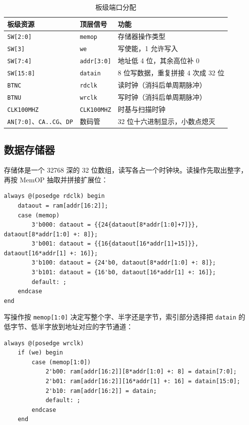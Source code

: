 \documentclass[12pt, a4paper]{ctexart}
\begin{document}
\begin{table}[htbp]
    \centering
    \caption{板级端口分配}
    \begin{tabular}{lll}
        \hline
        板级资源 & 顶层信号 & 功能 \\
        \hline
        \texttt{SW[2:0]}  & \texttt{memop} & 存储器操作类型 \\
        \texttt{SW[3]}    & \texttt{we}    & 写使能，1 允许写入 \\
        \texttt{SW[7:4]}  & \texttt{addr[3:0]} & 地址低 4 位，其余高位补 0 \\
        \texttt{SW[15:8]} & \texttt{datain} & 8 位写数据，重复拼接 4 次成 32 位 \\
        \texttt{BTNC}     & \texttt{rdclk} & 读时钟（消抖后单周期脉冲）\\
        \texttt{BTNU}     & \texttt{wrclk} & 写时钟（消抖后单周期脉冲）\\
        \texttt{CLK100MHZ} & \texttt{CLK100MHZ} & 时基与扫描时钟 \\
        \texttt{AN[7:0]}、\texttt{CA..CG}、\texttt{DP} & 数码管 & 32 位十六进制显示，小数点熄灭 \\
        \hline
    \end{tabular}
\end{table}

\subsection{数据存储器}
存储体是一个 32768 深的 32 位数组，读写各占一个时钟块。读操作先取出整字，再按 MemOP 抽取并拼接扩展位：

\begin{lstlisting}
always @(posedge rdclk) begin
    dataout = ram[addr[16:2]];
    case (memop)
        3'b000: dataout = {{24{dataout[8*addr[1:0]+7]}}, dataout[8*addr[1:0] +: 8]};
        3'b001: dataout = {{16{dataout[16*addr[1]+15]}}, dataout[16*addr[1] +: 16]};
        3'b100: dataout = {24'b0, dataout[8*addr[1:0] +: 8]};
        3'b101: dataout = {16'b0, dataout[16*addr[1] +: 16]};
        default: ;
    endcase
end
\end{lstlisting}

\noindent 写操作按 \texttt{memop[1:0]} 决定写整个字、半字还是字节，索引部分选择把 \texttt{datain} 的低字节、低半字放到地址对应的字节通道：

\begin{lstlisting}
always @(posedge wrclk)
    if (we) begin
        case (memop[1:0])
            2'b00: ram[addr[16:2]][8*addr[1:0] +: 8] = datain[7:0];
            2'b01: ram[addr[16:2]][16*addr[1] +: 16] = datain[15:0];
            2'b10: ram[addr[16:2]] = datain;
            default: ;
        endcase
    end
\end{lstlisting}
\end{document}
